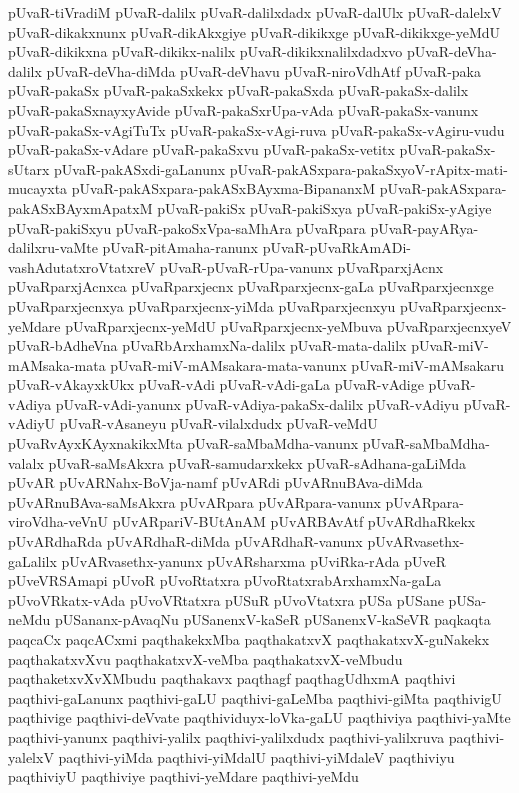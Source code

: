{pUvaR-tiVradiM
pUvaR-dalilx
pUvaR-dalilxdadx
pUvaR-dalUlx
pUvaR-dalelxV
pUvaR-dikakxnunx
pUvaR-dikAkxgiye
pUvaR-dikikxge
pUvaR-dikikxge-yeMdU
pUvaR-dikikxna
pUvaR-dikikx-nalilx
pUvaR-dikikxnalilxdadxvo
pUvaR-deVha-dalilx
pUvaR-deVha-diMda
pUvaR-deVhavu
pUvaR-niroVdhAtf
pUvaR-paka
pUvaR-pakaSx
pUvaR-pakaSxkekx
pUvaR-pakaSxda
pUvaR-pakaSx-dalilx
pUvaR-pakaSxnayxyAvide
pUvaR-pakaSxrUpa-vAda
pUvaR-pakaSx-vanunx
pUvaR-pakaSx-vAgiTuTx
pUvaR-pakaSx-vAgi-ruva
pUvaR-pakaSx-vAgiru-vudu
pUvaR-pakaSx-vAdare
pUvaR-pakaSxvu
pUvaR-pakaSx-vetitx
pUvaR-pakaSx-sUtarx
pUvaR-pakASxdi-gaLanunx
pUvaR-pakASxpara-pakaSxyoV-rApitx-mati-mucayxta
pUvaR-pakASxpara-pakASxBAyxma-BipananxM
pUvaR-pakASxpara-pakASxBAyxmApatxM
pUvaR-pakiSx
pUvaR-pakiSxya
pUvaR-pakiSx-yAgiye
pUvaR-pakiSxyu
pUvaR-pakoSxVpa-saMhAra
pUvaRpara
pUvaR-payARya-dalilxru-vaMte
pUvaR-pitAmaha-ranunx
pUvaR-pUvaRkAmADi-vashAdutatxroVtatxreV
pUvaR-pUvaR-rUpa-vanunx
pUvaRparxjAcnx
pUvaRparxjAcnxca
pUvaRparxjecnx
pUvaRparxjecnx-gaLa
pUvaRparxjecnxge
pUvaRparxjecnxya
pUvaRparxjecnx-yiMda
pUvaRparxjecnxyu
pUvaRparxjecnx-yeMdare
pUvaRparxjecnx-yeMdU
pUvaRparxjecnx-yeMbuva
pUvaRparxjecnxyeV
pUvaR-bAdheVna
pUvaRbArxhamxNa-dalilx
pUvaR-mata-dalilx
pUvaR-miV-mAMsaka-mata
pUvaR-miV-mAMsakara-mata-vanunx
pUvaR-miV-mAMsakaru
pUvaR-vAkayxkUkx
pUvaR-vAdi
pUvaR-vAdi-gaLa
pUvaR-vAdige
pUvaR-vAdiya
pUvaR-vAdi-yanunx
pUvaR-vAdiya-pakaSx-dalilx
pUvaR-vAdiyu
pUvaR-vAdiyU
pUvaR-vAsaneyu
pUvaR-vilalxdudx
pUvaR-veMdU
pUvaRvAyxKAyxnakikxMta
pUvaR-saMbaMdha-vanunx
pUvaR-saMbaMdha-valalx
pUvaR-saMsAkxra
pUvaR-samudarxkekx
pUvaR-sAdhana-gaLiMda
pUvAR
pUvARNahx-BoVja-namf
pUvARdi
pUvARnuBAva-diMda
pUvARnuBAva-saMsAkxra
pUvARpara
pUvARpara-vanunx
pUvARpara-viroVdha-veVnU
pUvARpariV-BUtAnAM
pUvARBAvAtf
pUvARdhaRkekx
pUvARdhaRda
pUvARdhaR-diMda
pUvARdhaR-vanunx
pUvARvasethx-gaLalilx
pUvARvasethx-yanunx
pUvARsharxma
pUviRka-rAda
pUveR
pUveVRSAmapi
pUvoR
pUvoRtatxra
pUvoRtatxrabArxhamxNa-gaLa
pUvoVRkatx-vAda
pUvoVRtatxra
pUSuR
pUvoVtatxra
pUSa
pUSane
pUSa-neMdu
pUSananx-pAvaqNu
pUSanenxV-kaSeR
pUSanenxV-kaSeVR
paqkaqta
paqcaCx
paqcACxmi
paqthakekxMba
paqthakatxvX
paqthakatxvX-guNakekx
paqthakatxvXvu
paqthakatxvX-veMba
paqthakatxvX-veMbudu
paqthaketxvXvXMbudu
paqthakavx
paqthagf
paqthagUdhxmA
paqthivi
paqthivi-gaLanunx
paqthivi-gaLU
paqthivi-gaLeMba
paqthivi-giMta
paqthivigU
paqthivige
paqthivi-deVvate
paqthividuyx-loVka-gaLU
paqthiviya
paqthivi-yaMte
paqthivi-yanunx
paqthivi-yalilx
paqthivi-yalilxdudx
paqthivi-yalilxruva
paqthivi-yalelxV
paqthivi-yiMda
paqthivi-yiMdalU
paqthivi-yiMdaleV
paqthiviyu
paqthiviyU
paqthiviye
paqthivi-yeMdare
paqthivi-yeMdu
}
